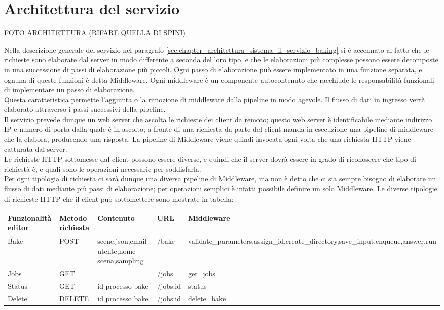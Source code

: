 \section{Architettura del servizio}
\label{sec:chapter_baking_service_architettura_servizio}

FOTO ARCHITETTURA (RIFARE QUELLA DI SPINI)

Nella descrizione generale del servizio nel paragrafo \ref{sec:chapter_architettura_sistema_il_servizio_baking} si è accennato al fatto che le richieste sono elaborate dal server in modo differente a seconda del loro tipo, e che le elaborazioni più complesse possono essere decomposte in una successione di passi di elaborazione più piccoli. Ogni passo di elaborazione può essere implementato in una funzione separata, e ognuna di queste funzioni è detta Middleware. Ogni middleware è un componente autocontenuto che racchiude le responsabilità funzionali di implementare un passo di elaborazione.
\\
Questa caratteristica permette l’aggiunta o la rimozione di middleware dalla pipeline in modo agevole. Il flusso di dati in ingresso verrà elaborato attraverso i passi successivi della pipeline. 
\\
Il servizio prevede dunque un web server che ascolta le richieste dei client da remoto; questo web server è identificabile mediante indirizzo IP e numero di porta dalla quale è in ascolto; a fronte di una richiesta da parte del client manda in esecuzione una pipeline di middleware che la elabora, producendo una risposta. La pipeline di Middleware viene quindi invocata ogni volta che una richiesta HTTP viene catturata dal server. 
\\
Le richieste HTTP sottomesse dal client possono essere diverse, e quindi che il server dovrà essere in grado di riconoscere che tipo di richiestà è, e quali sono le operazioni necessarie per soddisfarla. 
\\
Per ogni tipologia di richiesta ci sarà dunque una diversa pipeline di Middleware, ma non è detto che ci sia sempre bisogno di elaborare un flusso di dati mediante più passi di elaborazione; per operazioni semplici è infatti possibile definire un solo Middleware. 
Le diverse tipologie di richieste HTTP che il client può sottomettere sono mostrate in tabella:
\begin{center}
	\begin{tabular}{| p{2cm} | p{1.5cm} | p{3cm} | l | p{3cm} |}
    \hline
    Funzionalità editor & Metodo richiesta & Contenuto & URL & Middleware\\ \hline
    Bake & POST & scene.json,email utente,nome scena,sampling & /bake & validate\_parameters,assign\_id,create\_directory,save\_input,enqueue,answer,run\\ \hline
    Jobs & GET &  & /jobs & get\_jobs\\ \hline
	Status & GET & id processo bake & /jobs:id & status\\ \hline
    Delete & DELETE & id processo bake & /jobs:id & delete\_bake\\ 
    \hline
    \end{tabular}
\end{center}